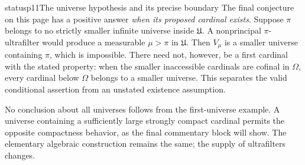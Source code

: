\begin{dcomment}{status}{p11}{The universe hypothesis and its precise boundary}
The final conjecture on this page has a positive answer \emph{when its proposed cardinal exists}. Suppose $\pi$ belongs to no strictly smaller infinite universe inside $\mathfrak U$. A nonprincipal $\pi$-ultrafilter would produce a measurable $\mu>\pi$ in $\mathfrak U$. Then $V_\mu$ is a smaller universe containing $\pi$, which is impossible. There need not, however, be a first cardinal with the stated property: when the smaller inaccessible cardinals are cofinal in $\Omega$, every cardinal below $\Omega$ belongs to a smaller universe. This separates the valid conditional assertion from an unstated existence assumption.

No conclusion about all universes follows from the first-universe example. A universe containing a sufficiently large strongly compact cardinal permits the opposite compactness behavior, as the final commentary block will show. The elementary algebraic construction remains the same; the supply of ultrafilters changes.
\end{dcomment}

